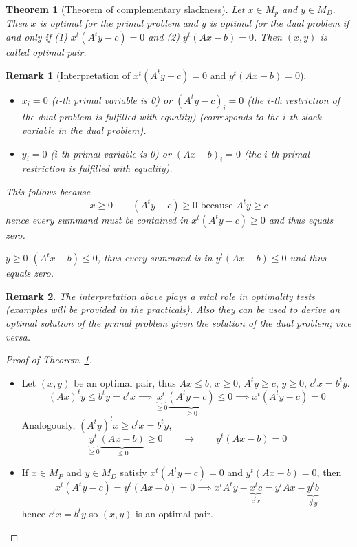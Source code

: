\documentclass[a4paper]{article}
\newcounter{lecref}[section]
\numberwithin{lecref}{section}
\newtheorem{theorem}[lecref]{Theorem}
\newtheorem*{Remark}{Remark}
\begin{document}
\begin{theorem}[Theorem of complementary slackness]
	\label{theorem:4.7}
	Let $x \in M_p$ and $y \in M_D$. Then $x$ is optimal for the primal problem and $y$ is optimal for the dual problem
	if and only if (1) $x^t (A^t y - c) = 0$ and (2) $y^t (Ax - b) = 0$. Then $(x, y)$ is called \emph{optimal pair}.
\end{theorem}

\begin{Remark}[Interpretation of $x^t (A^t y - c) = 0$ and $y^t (Ax - b) = 0$]
	\begin{itemize}
		\item $x_i = 0$ ($i$-th primal variable is 0) or $(A^t y - c)_i = 0$ (the $i$-th restriction of the dual problem is fulfilled with equality) (corresponds to the $i$-th slack variable in the dual problem).
		\item $y_i = 0$ ($i$-th primal variable is 0) or $(Ax - b)_i = 0$ (the $i$-th primal restriction is fulfilled with equality).
	\end{itemize}
	This follows because
	\[ x \geq 0 \qquad (A^t y - c) \geq 0 \text{ because } A^t y \geq c \]
	hence every summand must be contained in $x^t (A^ty - c) \geq 0$ and thus equals zero.

	$y \geq 0$ $(A^t x - b) \leq 0$, thus every summand is in $y^t (Ax - b) \leq 0$ und thus equals zero.
\end{Remark}

\begin{Remark}
	The interpretation above plays a vital role in optimality tests (examples will be provided in the practicals).
	Also they can be used to derive an optimal solution of the primal problem given the solution of the dual problem; vice versa.
\end{Remark}

\begin{proof}[Proof of Theorem~\ref{theorem:4.7}]
	\begin{itemize}
		\item 
			Let $(x, y)$ be an optimal pair, thus $Ax \leq b$, $x \geq 0$, $A^t y \geq c$, $y \geq 0$, $c^t x = b^t y$.
			\[ (Ax)^t y \leq b^t y = c^t x \implies \underbrace{x^t}_{\geq 0} \underbrace{(A^ty - c)}_{\geq 0} \leq 0 \implies x^t (A^t y - c) = 0 \]
			Analogously, $(A^t y)^t x \geq c^t x = b^t y$,
			\[ \underbrace{y^t}_{\geq 0} \underbrace{(Ax - b)}_{\leq 0} \geq 0 \qquad \to \qquad y^t (Ax - b) = 0 \]
		\item
			If $x \in M_P$ and $y \in M_D$ satisfy $x^t (A^t y - c) = 0$ and $y^t (Ax - b) = 0$,
			then
			\[ x^t (A^t y - c) = y^t (Ax - b) = 0 \implies x^t A^t y - \underbrace{x^t c}_{c^t x} = y^t Ax - \underbrace{y^t b}_{b^t y} \]
			hence $c^t x = b^t y$ so $(x, y)$ is an optimal pair.
	\end{itemize}
\end{proof}
\end{document}
